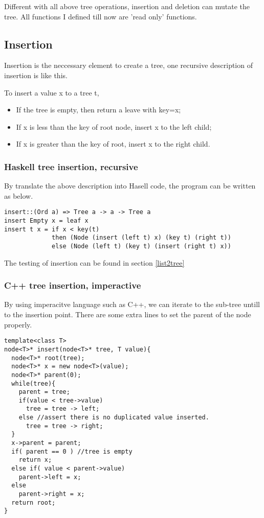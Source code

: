 \documentclass{article}
\begin{document}
Different with all above tree operations, insertion and deletion can mutate
the tree. All functions I defined till now are 'read only' functions.

\subsection{Insertion}
Insertion is the neccessary element to create a tree, one recursive description
of insertion is like this.

To insert a value x to a tree t,
\begin{itemize}
\item If the tree is empty, then return a leave with key=x;
\item If x is less than the key of root node, insert x to the left child;
\item If x is greater than the key of root, insert x to the right child.
\end{itemize}

\subsubsection*{Haskell tree insertion, recursive}
By translate the above description into Hasell code, the program can be written
as below.

\begin{lstlisting}
insert::(Ord a) => Tree a -> a -> Tree a
insert Empty x = leaf x
insert t x = if x < key(t) 
             then (Node (insert (left t) x) (key t) (right t))
             else (Node (left t) (key t) (insert (right t) x))
\end{lstlisting}

The testing of insertion can be found in section \ref{list2tree}

\subsubsection*{C++ tree insertion, imperactive}

By using imperacitve language such as C++, we can iterate to the sub-tree untill
to the insertion point. There are some extra lines to set the parent of the node
properly.

\lstset{language=C++}
\begin{lstlisting}
template<class T>
node<T>* insert(node<T>* tree, T value){
  node<T>* root(tree);
  node<T>* x = new node<T>(value);
  node<T>* parent(0);
  while(tree){
    parent = tree;
    if(value < tree->value)
      tree = tree -> left;
    else //assert there is no duplicated value inserted.
      tree = tree -> right;
  }
  x->parent = parent;
  if( parent == 0 ) //tree is empty
    return x;
  else if( value < parent->value)
    parent->left = x;
  else
    parent->right = x;
  return root;
}
\end{lstlisting}
\end{document}
